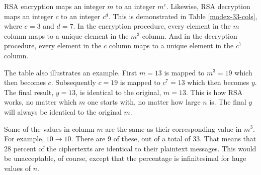 

RSA encryption maps an integer $m$ to an integer $m^e$.
Likewise, RSA decryption maps an integer $c$ to an integer $c^d$.
This is demonstrated in Table \ref{modex-33-cols}, where $e=3$ and $d=7$.
In the encryption procedure,
every element in the $m$ column maps to a unique element in the $m^3$ column.
And in the decryption procedure,
every element in the $c$ column maps to a unique element in the $c^7$ column.

\begin{table}[!h]
  \begin{center}
    
    \caption{$m \to c \to y \quad (\mathcal{R}_{33})$}
    \label{modex-33-cols}
  \end{center}
\end{table}


The table also illustrates an example.
First $m=13$ is mapped to $m^3=19$ which then becomes $c$.
Subsequently $c=19$ is mapped to $c^7=13$ which then becomes $y$.
The final result, $y=13$, is identical to the original, $m=13$.
This is how RSA works, no matter which $m$ one starts with, no matter how large $n$ is.
The final $y$ will always be identical to the original $m$.


\newpage

Some of the values in column $m$ are the same as their corresponding value in $m^3$.
For example, $10 \to 10$.  There are 9 of these, out of a total of 33.
That means that 28 percent of the ciphertexts are identical to their plaintext messages.
This would be unacceptable, of course,
except that the percentage is infinitesimal for huge values of $n$.

